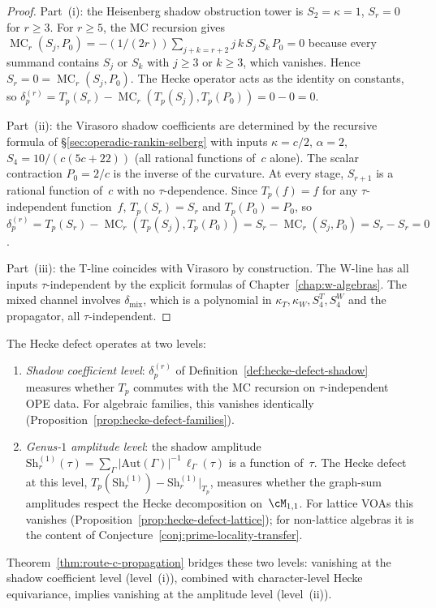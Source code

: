\begin{proof}
Part~(i): the Heisenberg shadow obstruction tower is
$S_2 = \kappa = 1$, $S_r = 0$ for $r \ge 3$.
For $r \ge 5$, the MC recursion gives
$\operatorname{MC}_r(S_j, P_0) = -(1/(2r))
\sum_{j+k=r+2} j\,k\,S_j\,S_k\,P_0 = 0$
because every summand contains $S_j$ or $S_k$ with
$j \ge 3$ or $k \ge 3$, which vanishes. Hence
$S_r = 0 = \operatorname{MC}_r(S_j, P_0)$.
The Hecke operator acts as the identity on constants,
so $\delta_p^{(r)} = T_p(S_r) - \operatorname{MC}_r
(T_p(S_j), T_p(P_0)) = 0 - 0 = 0$.

Part~(ii): the Virasoro shadow coefficients are determined
by the recursive formula of
\S\ref{sec:operadic-rankin-selberg} with inputs
$\kappa = c/2$, $\alpha = 2$,
$S_4 = 10/(c(5c{+}22))$ (all rational functions of~$c$
alone). The scalar contraction $P_0 = 2/c$ is the inverse of
the curvature. At every stage, $S_{r+1}$ is a rational
function of~$c$ with no $\tau$-dependence. Since
$T_p(f) = f$ for any $\tau$-independent function~$f$,
$T_p(S_r) = S_r$ and $T_p(P_0) = P_0$, so
$\delta_p^{(r)} = T_p(S_r) -
\operatorname{MC}_r(T_p(S_j), T_p(P_0))
= S_r - \operatorname{MC}_r(S_j, P_0) = S_r - S_r = 0$.

Part~(iii): the T-line coincides with Virasoro by
construction. The W-line has all inputs $\tau$-independent
by the explicit formulas of Chapter~\ref{chap:w-algebras}.
The mixed channel involves $\delta_{\mathrm{mix}}$, which
is a polynomial in $\kappa_T, \kappa_W, S_4^T, S_4^W$ and
the propagator, all $\tau$-independent.
\end{proof}

\begin{remark}%
\label{rem:hecke-defect-two-levels}%
The Hecke defect operates at two levels:
\begin{enumerate}[label=\textup{(\roman*)}]
\item \emph{Shadow coefficient level}: $\delta_p^{(r)}$ of
 Definition~\ref{def:hecke-defect-shadow} measures
 whether $T_p$ commutes with the MC recursion on
 $\tau$-independent OPE data. For algebraic families,
 this vanishes identically
 (Proposition~\ref{prop:hecke-defect-families}).

\item \emph{Genus-$1$ amplitude level}: the shadow
 amplitude $\mathrm{Sh}_r^{(1)}(\tau) =
 \sum_\Gamma |\mathrm{Aut}(\Gamma)|^{-1}\,\ell_\Gamma(\tau)$
 is a function of~$\tau$. The Hecke defect at this level,
 $T_p(\mathrm{Sh}_r^{(1)}) -
 \mathrm{Sh}_r^{(1)}|_{T_p}$,
 measures whether the graph-sum amplitudes respect the
 Hecke decomposition on~$\cM_{1,1}$. For lattice VOAs
 this vanishes
 (Proposition~\ref{prop:hecke-defect-lattice});
 for non-lattice algebras it is the content of
 Conjecture~\ref{conj:prime-locality-transfer}.
\end{enumerate}
Theorem~\ref{thm:route-c-propagation} bridges these
two levels: vanishing at the shadow coefficient level
\textup{(}level~\textup{(i)}\textup{)}, combined with
character-level Hecke equivariance, implies vanishing at
the amplitude level \textup{(}level~\textup{(ii)}\textup{)}.
\end{remark}

